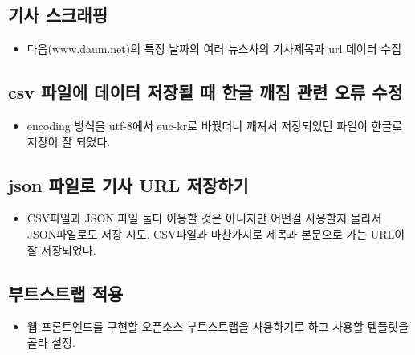 \documentclass[aps,10pt,a4paper]{article}
\begin{document}
\subsection{기사 스크래핑}
\begin{itemize}
\item 다음(www.daum.net)의 특정 날짜의 여러 뉴스사의 기사제목과 url 데이터 수집    
\end{itemize}

\subsection{csv 파일에 데이터 저장될 때 한글 깨짐 관련 오류 수정}
\begin{itemize}
\item encoding 방식을 utf-8에서 euc-kr로 바꿨더니 깨져서 저장되었던 파일이 한글로 저장이 잘 되었다.
\end{itemize}

\subsection{json 파일로 기사 URL 저장하기}
\begin{itemize}
\item CSV파일과 JSON 파일 둘다 이용할 것은 아니지만 어떤걸 사용할지 몰라서 JSON파일로도 저장 시도. CSV파일과 마찬가지로 제목과 본문으로 가는 URL이 잘 저장되었다. 
\end{itemize}

\subsection{부트스트랩 적용}
\begin{itemize}
\item 웹 프론트엔드를 구현할 오픈소스 부트스트랩을 사용하기로 하고 사용할 템플릿을 골라 설정.    
\end{itemize}
\end{document}
